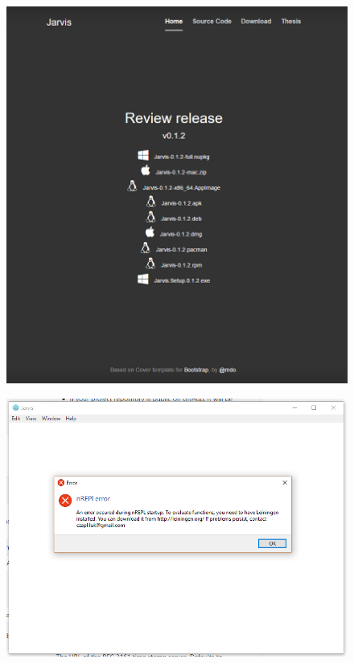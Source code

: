 \documentclass[english,mgr,shortabstract]{iithesis}
\begin{document}
\begin{figure}[hbt]
  \centering
  \begin{minipage}{0.48\linewidth}
    \centering
    \includegraphics[width=0.9\linewidth]{img/j-inst}
\label{fig:j-inst} 
  \end{minipage}%
  \begin{minipage}{0.48\linewidth}
    \centering
    \includegraphics[width=0.9\linewidth]{img/j-error}
\label{fig:j-error}
  \end{minipage}
\end{figure}
\end{document}
